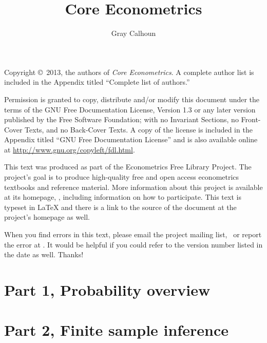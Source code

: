 \documentclass[nofonts,oneside,openany,notitlepage]{tufte-handout}
\title{Core Econometrics}
\author{Gray Calhoun}
\begin{document}
\maketitle

\bigskip\noindent%
Copyright \copyright\ 2013, the authors of \textit{Core Econometrics}.
A complete author list is included in the Appendix titled ``Complete
list of authors.''

Permission is granted to copy, distribute and/or modify this document
under the terms of the GNU Free Documentation License, Version 1.3 or
any later version published by the Free Software Foundation; with no
Invariant Sections, no Front-Cover Texts, and no Back-Cover Texts.  A
copy of the license is included in the Appendix titled ``GNU Free
Documentation License'' and is also available online at
\url{http://www.gnu.org/copyleft/fdl.html}.

This text was produced as part of the Econometrics Free Library
Project.  The project's goal is to produce high-quality free and
open access econometrics textbooks and reference material.  More
information about this project is available at its homepage,
\homepage, including information on how
to participate.  This text is typeset in LaTeX and there is a link
to the source of the document at the project's homepage as well.

\addciteinfo %

When you find errors in this text, please email the project mailing
list, \maillist\ or report the error at \bugtrack.  It would be
helpful if you could refer to the version number listed in the date as
well.  Thanks!
\newpage
\tableofcontents
\newpage
\part*{Part 1, Probability overview}%




\part*{Part 2, Finite sample inference}%










\end{document}
